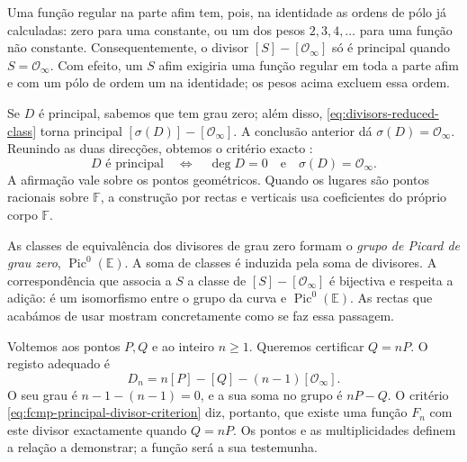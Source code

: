 Uma função regular na parte afim tem, pois, na identidade as ordens
de pólo já calculadas: zero para uma constante, ou um dos pesos
\(2,3,4,\ldots\) para uma função não constante. Consequentemente,
o divisor \([S]-[\mathcal O_\infty]\) só é principal quando
\(S=\mathcal O_\infty\). Com efeito, um \(S\) afim exigiria uma
função regular em toda a parte afim e com um pólo de ordem um na
identidade; os pesos acima excluem essa ordem.

Se \(D\) é principal, sabemos que tem grau zero; além disso,
\eqref{eq:divisors-reduced-class} torna principal
\([\sigma(D)]-[\mathcal O_\infty]\). A conclusão anterior dá
\(\sigma(D)=\mathcal O_\infty\). Reunindo as duas direcções,
obtemos o critério exacto \cite{eagen-divisors}:
\begin{equation}
 D\text{ é principal}\quad\Longleftrightarrow\quad
 \deg D=0\quad\text{e}\quad\sigma(D)=\mathcal O_\infty.
 \label{eq:fcmp-principal-divisor-criterion}
\end{equation}
A afirmação vale sobre os pontos geométricos. Quando os lugares são
pontos racionais sobre \(\mathbb F\), a construção por rectas e
verticais usa coeficientes do próprio corpo \(\mathbb F\).

As classes de equivalência dos divisores de grau zero formam o
\emph{grupo de Picard de grau zero}, \(\operatorname{Pic}^0(\mathbb E)\).
A soma de classes é induzida pela soma de divisores. A correspondência
que associa a \(S\) a classe de \([S]-[\mathcal O_\infty]\)
é bijectiva e respeita a adição: é um isomorfismo entre o grupo da
curva e \(\operatorname{Pic}^0(\mathbb E)\). As rectas que acabámos
de usar mostram concretamente como se faz essa passagem.


Voltemos aos pontos \(P,Q\) e ao inteiro \(n\geq1\). Queremos
certificar \(Q=nP\). O registo adequado é
\[
 D_n=n[P]-[Q]-(n-1)[\mathcal O_\infty].
\]
O seu grau é \(n-1-(n-1)=0\), e a sua soma no grupo é
\(nP-Q\). O critério \eqref{eq:fcmp-principal-divisor-criterion}
diz, portanto, que existe uma função \(F_n\) com este divisor
exactamente quando \(Q=nP\). Os pontos e as multiplicidades
definem a relação a demonstrar; a função será a sua testemunha.

